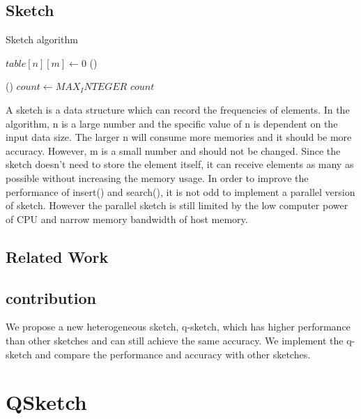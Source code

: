 \documentclass[conference]{IEEEtran}
\begin{document}
\subsection{Sketch}
\begin{algorithm}
\DontPrintSemicolon
\caption{Sketch algorithm}
$table[n][m] \longleftarrow 0$\;
\Fn()
{}
{
}

\Fn()
{}
{
    $count \leftarrow MAX_INTEGER$\;
    \KwRet $count$\;
}
\end{algorithm}

A sketch is a data structure which can record the frequencies of elements. In the algorithm, n is a large number and the specific value of n is dependent on the input data size. The larger n will consume more memories and it should be more accuracy. However, m is a small number and should not be changed. 
Since the sketch doesn't need to store the element itself, it can receive elements as many as possible without increasing the memory usage.  
In order to improve the performance of insert() and search(), it is not odd to implement a parallel version of sketch. However the parallel sketch is still limited by the low computer power of CPU and narrow memory bandwidth of host memory. 

\subsection{Related Work}
\subsection{contribution}
We propose a new heterogeneous sketch, q-sketch, which has higher performance than other sketches and can still achieve the same accuracy. We implement the q-sketch and compare the performance and accuracy with other sketches. 
\section{QSketch}
\end{document}
